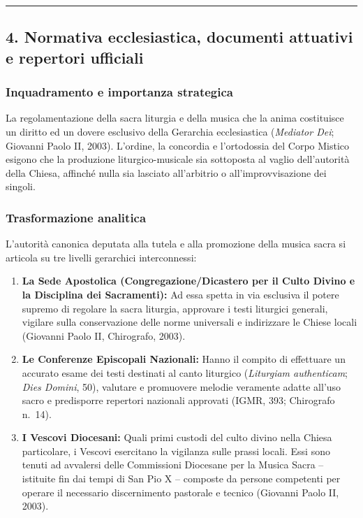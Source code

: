 \documentclass[12pt,a4paper]{article}
\begin{document}
	\begin{center}\rule{0.5\linewidth}{0.5pt}\end{center}
	
	\subsection{4. Normativa ecclesiastica, documenti attuativi e repertori ufficiali}\label{normativa-ecclesiastica-documenti-attuativi-e-repertori-ufficiali}
	
	\subsubsection{Inquadramento e importanza strategica}\label{inquadramento-e-importanza-strategica-3}
	
	La regolamentazione della sacra liturgia e della musica che la anima costituisce un diritto ed un dovere esclusivo della Gerarchia ecclesiastica (\emph{Mediator Dei}; Giovanni Paolo II, 2003). L'ordine, la concordia e l'ortodossia del Corpo Mistico esigono che la produzione liturgico-musicale sia sottoposta al vaglio dell'autorità della Chiesa, affinché nulla sia lasciato all'arbitrio o all'improvvisazione dei singoli.
	
	\subsubsection{Trasformazione analitica}\label{trasformazione-analitica-3}
	
	L'autorità canonica deputata alla tutela e alla promozione della musica sacra si articola su tre livelli gerarchici interconnessi:
	
	\begin{enumerate}[label=\arabic*.,leftmargin=*]
		\item \textbf{La Sede Apostolica (Congregazione/Dicastero per il Culto Divino e la Disciplina dei Sacramenti):} Ad essa spetta in via esclusiva il potere supremo di regolare la sacra liturgia, approvare i testi liturgici generali, vigilare sulla conservazione delle norme universali e indirizzare le Chiese locali (Giovanni Paolo II, Chirografo, 2003).
		\item \textbf{Le Conferenze Episcopali Nazionali:} Hanno il compito di effettuare un accurato esame dei testi destinati al canto liturgico (\emph{Liturgiam authenticam}; \emph{Dies Domini}, 50), valutare e promuovere melodie veramente adatte all'uso sacro e predisporre repertori nazionali approvati (IGMR, 393; Chirografo n.~14).
		\item \textbf{I Vescovi Diocesani:} Quali primi custodi del culto divino nella Chiesa particolare, i Vescovi esercitano la vigilanza sulle prassi locali. Essi sono tenuti ad avvalersi delle Commissioni Diocesane per la Musica Sacra -- istituite fin dai tempi di San Pio X -- composte da persone competenti per operare il necessario discernimento pastorale e tecnico (Giovanni Paolo II, 2003).
	\end{enumerate}
	
\end{document}
